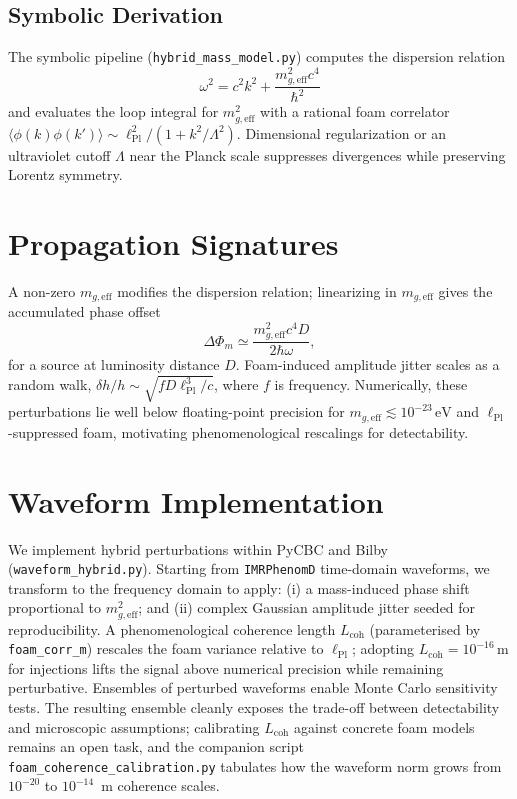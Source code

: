 \documentclass[12pt]{article}
\begin{document}
\subsection{Symbolic Derivation}
The symbolic pipeline (\texttt{hybrid\_mass\_model.py}) computes the dispersion relation
\begin{equation}
\omega^2 = c^2 k^2 + \frac{m_{g,\mathrm{eff}}^2 c^4}{\hbar^2}
\end{equation}
and evaluates the loop integral for $m_{g,\mathrm{eff}}^2$ with a rational foam correlator $\langle \phi(k) \phi(k') \rangle \sim \ell_{\mathrm{Pl}}^2 / (1 + k^2/\Lambda^2)$. Dimensional regularization or an ultraviolet cutoff $\Lambda$ near the Planck scale suppresses divergences while preserving Lorentz symmetry.

\section{Propagation Signatures}
A non-zero $m_{g,\mathrm{eff}}$ modifies the dispersion relation; linearizing in $m_{g,\mathrm{eff}}$ gives the accumulated phase offset
\begin{equation}
\Delta \Phi_{m} \simeq \frac{m_{g,\mathrm{eff}}^2 c^4 D}{2 \hbar \omega},
\end{equation}
for a source at luminosity distance $D$. Foam-induced amplitude jitter scales as a random walk, $\delta h / h \sim \sqrt{f D \ell_{\mathrm{Pl}}^3 / c}$, where $f$ is frequency. Numerically, these perturbations lie well below floating-point precision for $m_{g,\mathrm{eff}} \lesssim 10^{-23}\,\mathrm{eV}$ and $\ell_{\mathrm{Pl}}$-suppressed foam, motivating phenomenological rescalings for detectability.

\section{Waveform Implementation}
We implement hybrid perturbations within PyCBC and Bilby (\texttt{waveform\_hybrid.py}). Starting from \texttt{IMRPhenomD} time-domain waveforms, we transform to the frequency domain to apply: (i) a mass-induced phase shift proportional to $m_{g,\mathrm{eff}}^2$; and (ii) complex Gaussian amplitude jitter seeded for reproducibility. A phenomenological coherence length $L_{\mathrm{coh}}$ (parameterised by \texttt{foam\_corr\_m}) rescales the foam variance relative to $\ell_{\mathrm{Pl}}$; adopting $L_{\mathrm{coh}}=10^{-16}\,\mathrm{m}$ for injections lifts the signal above numerical precision while remaining perturbative. Ensembles of perturbed waveforms enable Monte Carlo sensitivity tests. The resulting ensemble cleanly exposes the trade-off between detectability and microscopic assumptions; calibrating $L_{\mathrm{coh}}$ against concrete foam models remains an open task, and the companion script \texttt{foam\_coherence\_calibration.py} tabulates how the waveform norm grows from $10^{-20}$ to $10^{-14}$~m coherence scales.
\end{document}
